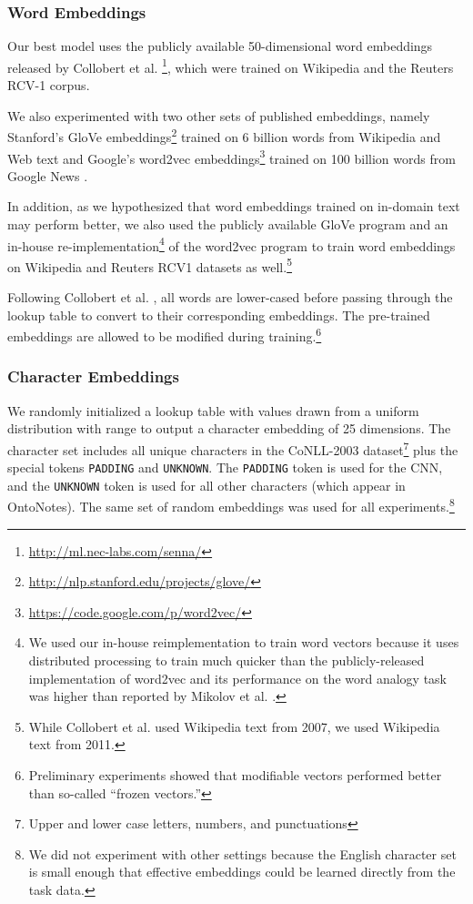 \documentclass[11pt,letterpaper]{article}
\begin{document}
\subsubsection{Word Embeddings}
Our best model uses the publicly available 50-dimensional word embeddings released by Collobert et al. \footnote{\url{http://ml.nec-labs.com/senna/}}, which were trained on Wikipedia and the Reuters RCV-1 corpus. 

We also experimented with two other sets of published embeddings, namely Stanford's GloVe embeddings\footnote{\url{http://nlp.stanford.edu/projects/glove/}} trained on 6 billion words from Wikipedia and Web text \cite{pennington2014} and Google's word2vec embeddings\footnote{\url{https://code.google.com/p/word2vec/}} trained on 100 billion words from Google News \cite{mikolov2013}.

In addition, as we hypothesized that word embeddings trained on in-domain text may perform better, we also used the publicly available GloVe \cite{pennington2014} program and an in-house re-implementation\footnote{We used our in-house reimplementation to train word vectors because it uses distributed processing to train much quicker than the publicly-released implementation of word2vec and its performance on the word analogy task was higher than reported by Mikolov et al. .} of the word2vec \cite{mikolov2013} program to train word embeddings on Wikipedia and Reuters RCV1 datasets as well.\footnote{While Collobert et al.  used Wikipedia text from 2007, we used Wikipedia text from 2011.}

Following Collobert et al. , all words are lower-cased before passing through the lookup table to convert to their corresponding embeddings. The pre-trained embeddings are allowed to be modified during training.\footnote{Preliminary experiments showed that modifiable vectors performed better than so-called ``frozen vectors.''}

\subsubsection{Character Embeddings}
\label{sec:charvec}
We randomly initialized a lookup table with values drawn from a uniform distribution with range  to output a character embedding of 25 dimensions. The character set includes all unique characters in the CoNLL-2003 dataset\footnote{Upper and lower case letters, numbers, and punctuations} plus the special tokens {\tt PADDING} and {\tt UNKNOWN}. The {\tt PADDING} token is used for the CNN, and the {\tt UNKNOWN} token is used for all other characters (which appear in OntoNotes). The same set of random embeddings was used for all experiments.\footnote{We did not experiment with other settings because the English character set is small enough that effective embeddings could be learned directly from the task data.}
\end{document}
